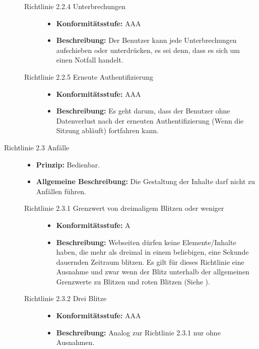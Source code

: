 \begin{description}
\begin{description}
		\item[Richtlinie 2.2.4 Unterbrechungen]\hfill
		\begin{itemize}
			\item \textbf{Konformitätsstufe:} AAA
			\item \textbf{Beschreibung:} Der Benutzer kann jede Unterbrechungen aufschieben oder unterdrücken, es sei denn, dass es sich um einen Notfall handelt.
		\end{itemize}
		
		\item[Richtlinie 2.2.5 Erneute Authentifizierung]\hfill
		\begin{itemize}
			\item \textbf{Konformitätsstufe:} AAA
			\item \textbf{Beschreibung:} Es geht darum, dass der Benutzer ohne Datenverlust nach der erneuten Authentifizierung (Wenn die Sitzung abläuft) 
			fortfahren kann.
		\end{itemize}
	\end{description}
	
	\item [Richtlinie 2.3 Anfälle]\hfill
	\begin{itemize}
		\item \textbf{Prinzip:} Bedienbar.
		\item \textbf{Allgemeine Beschreibung:} Die Gestaltung der Inhalte darf nicht zu Anfällen führen.
	\end{itemize}
	
	\begin{description}
		\item[Richtlinie 2.3.1 Grenzwert von dreimaligem Blitzen oder weniger]\hfill
		\begin{itemize}
			\item \textbf{Konformitätsstufe:} A
			\item \textbf{Beschreibung:} Webseiten dürfen keine Elemente/Inhalte haben, die mehr als dreimal in einem beliebigen, eine Sekunde dauernden Zeitraum 
			blitzen. Es gilt für dieses Richtlinie eine Ausnahme und zwar wenn der Blitz unterhalb der allgemeinen Grenzwerte zu Blitzen und roten Blitzen 
			(Siehe ).
		\end{itemize}
		
		\item[Richtlinie 2.3.2 Drei Blitze]\hfill
		\begin{itemize}
			\item \textbf{Konformitätsstufe:} AAA
			\item \textbf{Beschreibung:} Analog zur Richtlinie 2.3.1 nur ohne Ausnahmen.
		\end{itemize}
	\end{description}
	

\end{description}
